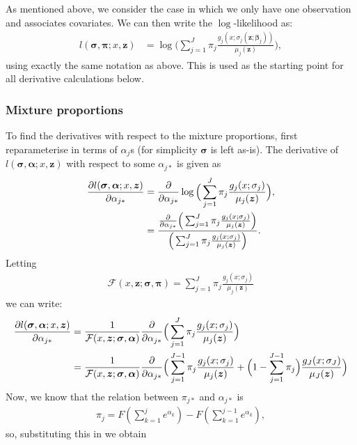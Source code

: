As mentioned above, we consider the case in which we only have one observation and associates covariates. We can then write the $\log$-likelihood as:
\begin{align*}
l(\bm{\sigma},\bm{\pi}; x, \bm{z}) &= \log\Big(\sum_{j=1}^J \pi_j \frac{g_j(x;\sigma_j(\bm{z};\bm{\beta}_j))}{\mu_j(\bm{z})}\Big),
\end{align*}
using exactly the same notation as above. This is used as the starting point for all derivative calculations below.


\subsubsection{Mixture proportions}


To find the derivatives with respect to the mixture proportions, first reparameterise in terms of $\alpha_j$s (for simplicity $\bm{\sigma}$ is left as-is). The derivative of $l(\bm{\sigma},\bm{\alpha};x, \bm{z})$ with respect to some $\alpha_{j*}$ is given as
\begin{align*}
\frac{\partial l(\bm{\sigma},\bm{\alpha}; x, \bm{z})}{\partial \alpha_{j*}} &= \frac{\partial}{\partial \alpha_{j*}} \log\Big(\sum_{j=1}^J \pi_j \frac{g_j(x;\sigma_j)}{\mu_j(\bm{z})}\Big),\\
&= \frac{\frac{\partial}{\partial \alpha_{j*}} \Big(\sum_{j=1}^J \pi_j \frac{g_j(x;\sigma_j)}{\mu_j(\bm{z})}\Big)}{\Big(\sum_{j=1}^J \pi_j \frac{g_j(x;\sigma_j)}{\mu_j(\bm{z})}\Big)}.
\end{align*}
Letting
\begin{align*}
\mathcal{F}(x, \bm{z};\bm{\sigma},\bm{\pi})=\sum_{j=1}^J \pi_j \frac{g_j(x;\sigma_j)}{\mu_j(\bm{z})}
\end{align*}
we can write:
\begin{align*}
\frac{\partial l(\bm{\sigma},\bm{\alpha};x,\bm{z})}{\partial \alpha_{j*}} &= \frac{1}{\mathcal{F}(x,\bm{z} ;\bm{\sigma},\bm{\alpha})} \frac{\partial}{\partial \alpha_{j*}} \Big(\sum_{j=1}^J \pi_j \frac{g_j(x;\sigma_j)}{\mu_j(\bm{z})}\Big)\\
&= \frac{1}{\mathcal{F}(x, \bm{z};\bm{\sigma},\bm{\alpha})} \frac{\partial}{\partial \alpha_{j*}} \Big( \sum_{j=1}^{J-1}\pi_j \frac{g_j(x; \sigma_j)}{\mu_j(\bm{z})} + \Big(1-\sum_{j=1}^{J-1}\pi_j \Big) \frac{g_J(x;\sigma_J)}{\mu_J(\bm{z})}\Big)
\end{align*}
Now, we know that the relation between $\pi_{j*}$ and $\alpha_{j*}$ is
\begin{align*}
\pi_j = F(\sum_{k=1}^j e^{\alpha_k}) - F(\sum_{k=1}^{j-1} e^{\alpha_k}),
\end{align*}
so, substituting this in we obtain
